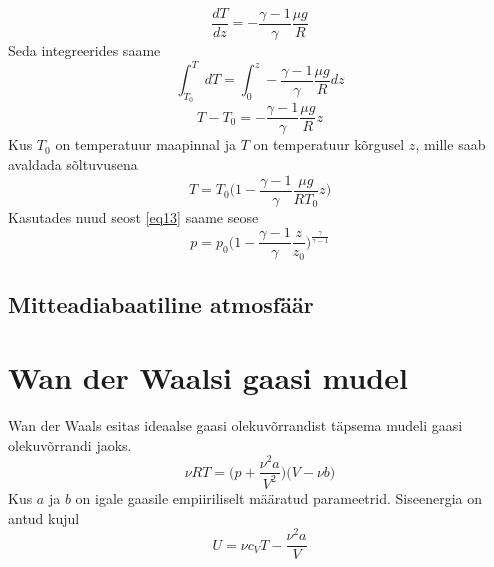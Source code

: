 \documentclass{trkut}%
\begin{document}
\begin{equation*}
\frac{dT}{dz}=-\frac{\gamma-1}{\gamma} \frac{\mu g}{R}
\end{equation*}
Seda integreerides saame
\begin{equation*}
\int_{T_0}^{T} dT = \int_{0}^{z} -\frac{\gamma-1}{\gamma} \frac{\mu g}{R} dz
\end{equation*}
\begin{equation*}
T - T_0 = - \frac{\gamma - 1}{\gamma} \frac{\mu g}{R} z
\end{equation*}
Kus $T_0$ on temperatuur maapinnal ja $T$ on temperatuur kõrgusel $z$, mille saab avaldada sõltuvusena
\begin{equation*}
T=T_0 \bigg( 1-\frac{\gamma-1}{\gamma} \frac{\mu g}{R T_0} z \bigg)
\end{equation*}
Kasutades nuud seost \ref{eq13} saame seose
\begin{equation*}
p = p_0 \bigg( 1-\frac{\gamma-1}{\gamma} \frac{z}{z_0} \bigg)^\frac{\gamma}{\gamma-1}
\end{equation*}

\subsection{Mitteadiabaatiline atmosfäär}

\section{Wan der Waalsi gaasi mudel}
Wan der Waals esitas ideaalse gaasi olekuvõrrandist täpsema mudeli gaasi olekuvõrrandi jaoks.
\begin{equation}\label{eq15}
\nu RT = \bigg( p+\frac{\nu^2 a}{V^2} \bigg) \bigg( V - \nu b \bigg)
\end{equation}
Kus $a$ ja $b$ on igale  gaasile empiiriliselt määratud parameetrid. Siseenergia on antud kujul
\begin{equation}\label{eq14}
U = \nu c_VT-\frac{\nu^2 a}{V}
\end{equation}
\end{document}
